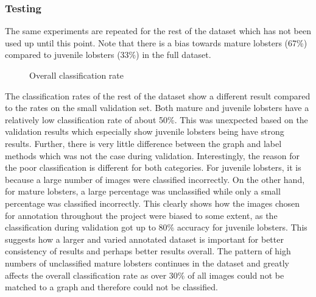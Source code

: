 \subsubsection{Testing}
The same experiments are repeated for the rest of the dataset which has not been used up until this point. Note that there is a bias towards mature lobsters (67\%) compared to juvenile lobsters (33\%) in the full dataset.
\begin{figure}[H]
\centering
{}
\caption{Overall classification rate}
\end{figure}
\noindent
The classification rates of the rest of the dataset show a different result compared to the rates on the small validation set. Both mature and juvenile lobsters have a relatively low classification rate of about 50\%. This was unexpected based on the validation results which especially show juvenile lobsters being have strong results. Further, there is very little difference between the graph and label methods which was not the case during validation. Interestingly, the reason for the poor classification is different for both categories. For juvenile lobsters, it is because a large number of images were classified incorrectly. On the other hand, for mature lobsters, a large percentage was unclassified while only a small percentage was classified incorrectly. This clearly shows how the images chosen for annotation throughout the project were biased to some extent, as the classification during validation got up to 80\% accuracy for juvenile lobsters. This suggests how a larger and varied annotated dataset is important for better consistency of results and perhaps better results overall. The pattern of high numbers of unclassified mature lobsters continues in the dataset and greatly affects the overall classification rate as over 30\% of all images could not be matched to a graph and therefore could not be classified.
